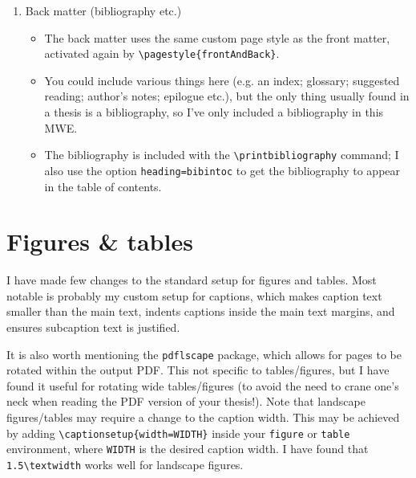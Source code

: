 \begin{enumerate}
\begin{itemize}
        \item Again, I have defined a custom page style for the main matter, activated by the command \verb!\pagestyle{main}! (note that this style also makes use of the ``plain'' page style for e.g. Chapter title-pages; the ``plain'' style is [re-]defined in the same location as the other styles).
        \item Chapters are included via the \verb!! command.
        \item Note that if you are working on a single chapter and want to quickly compile just that chapter to see the effect of your changes, you can add the command \verb!! to your preamble.
        \item Appendices are normal Chapters wrapped in their own environment: \verb!\begin{appendices}...\end{appendices}!.
    \end{itemize}
    \item Back matter (bibliography etc.)
    \begin{itemize}
        \item The back matter uses the same custom page style as the front matter, activated again by \verb!\pagestyle{frontAndBack}!.
        \item You could include various things here (e.g. an index; glossary; suggested reading; author's notes; epilogue etc.), but the only thing usually found in a thesis is a bibliography, so I've only included a bibliography in this MWE.
        \item The bibliography is included with the \verb!\printbibliography! command; I also use the option \verb!heading=bibintoc! to get the bibliography to appear in the table of contents.
    \end{itemize}
\end{enumerate}

\section{Figures \& tables}
I have made few changes to the standard setup for figures and tables.
Most notable is probably my custom setup for captions, which makes caption text smaller than the main text, indents captions inside the main text margins, and ensures subcaption text is justified.

It is also worth mentioning the \verb!pdflscape! package, which allows for pages to be rotated within the output PDF.
This not specific to tables/figures, but I have found it useful for rotating wide tables/figures (to avoid the need to crane one's neck when reading the PDF version of your thesis!).
Note that landscape figures/tables may require a change to the caption width.
This may be achieved by adding \verb!\captionsetup{width=WIDTH}! inside your \texttt{figure} or \texttt{table} environment, where \verb!WIDTH! is the desired caption width.
I have found that \verb!1.5\textwidth! works well for landscape figures.

